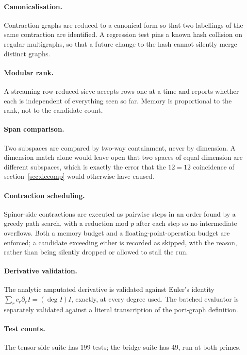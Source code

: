 \paragraph{Canonicalisation.} Contraction graphs are reduced to a canonical form
so that two labellings of the same contraction are identified. A regression test
pins a known hash collision on regular multigraphs, so that a future change to
the hash cannot silently merge distinct graphs.

\paragraph{Modular rank.} A streaming row-reduced sieve accepts rows one at a
time and reports whether each is independent of everything seen so far. Memory is
proportional to the rank, not to the candidate count.

\paragraph{Span comparison.} Two subspaces are compared by two-way containment,
never by dimension. A dimension match alone would leave open that two spaces of
equal dimension are different subspaces, which is exactly the error that the
$12=12$ coincidence of section~\ref{sec:decomp} would otherwise have caused.

\paragraph{Contraction scheduling.} Spinor-side contractions are executed as
pairwise steps in an order found by a greedy path search, with a reduction mod
$p$ after each step so no intermediate overflows. Both a memory budget and a
floating-point-operation budget are enforced; a candidate exceeding either is
recorded as skipped, with the reason, rather than being silently dropped or
allowed to stall the run.

\paragraph{Derivative validation.} The analytic amputated derivative is validated
against Euler's identity $\sum_r c_r \partial_r I = (\deg I) I$, exactly, at every
degree used. The batched evaluator is separately validated against a literal
transcription of the port-graph definition.

\paragraph{Test counts.} The tensor-side suite has 199 tests; the bridge suite has
49, run at both primes.
